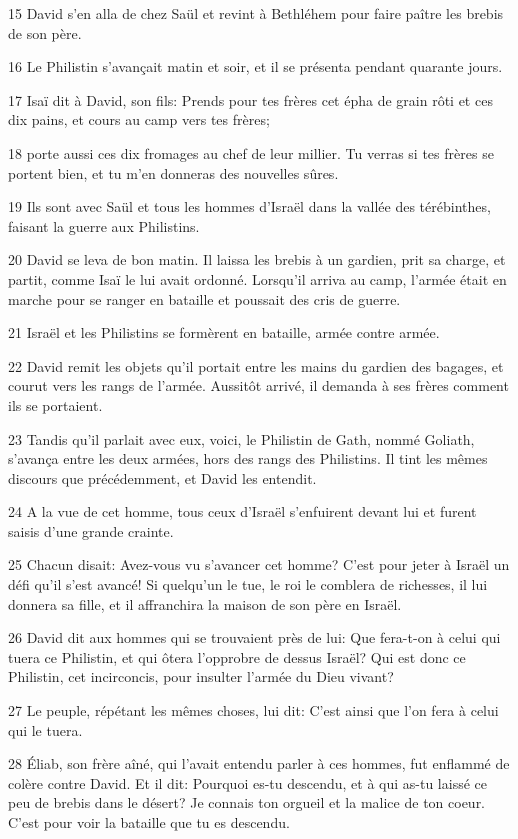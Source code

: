 \par 15 David s'en alla de chez Saül et revint à Bethléhem pour faire paître les brebis de son père.
\par 16 Le Philistin s'avançait matin et soir, et il se présenta pendant quarante jours.
\par 17 Isaï dit à David, son fils: Prends pour tes frères cet épha de grain rôti et ces dix pains, et cours au camp vers tes frères;
\par 18 porte aussi ces dix fromages au chef de leur millier. Tu verras si tes frères se portent bien, et tu m'en donneras des nouvelles sûres.
\par 19 Ils sont avec Saül et tous les hommes d'Israël dans la vallée des térébinthes, faisant la guerre aux Philistins.
\par 20 David se leva de bon matin. Il laissa les brebis à un gardien, prit sa charge, et partit, comme Isaï le lui avait ordonné. Lorsqu'il arriva au camp, l'armée était en marche pour se ranger en bataille et poussait des cris de guerre.
\par 21 Israël et les Philistins se formèrent en bataille, armée contre armée.
\par 22 David remit les objets qu'il portait entre les mains du gardien des bagages, et courut vers les rangs de l'armée. Aussitôt arrivé, il demanda à ses frères comment ils se portaient.
\par 23 Tandis qu'il parlait avec eux, voici, le Philistin de Gath, nommé Goliath, s'avança entre les deux armées, hors des rangs des Philistins. Il tint les mêmes discours que précédemment, et David les entendit.
\par 24 A la vue de cet homme, tous ceux d'Israël s'enfuirent devant lui et furent saisis d'une grande crainte.
\par 25 Chacun disait: Avez-vous vu s'avancer cet homme? C'est pour jeter à Israël un défi qu'il s'est avancé! Si quelqu'un le tue, le roi le comblera de richesses, il lui donnera sa fille, et il affranchira la maison de son père en Israël.
\par 26 David dit aux hommes qui se trouvaient près de lui: Que fera-t-on à celui qui tuera ce Philistin, et qui ôtera l'opprobre de dessus Israël? Qui est donc ce Philistin, cet incirconcis, pour insulter l'armée du Dieu vivant?
\par 27 Le peuple, répétant les mêmes choses, lui dit: C'est ainsi que l'on fera à celui qui le tuera.
\par 28 Éliab, son frère aîné, qui l'avait entendu parler à ces hommes, fut enflammé de colère contre David. Et il dit: Pourquoi es-tu descendu, et à qui as-tu laissé ce peu de brebis dans le désert? Je connais ton orgueil et la malice de ton coeur. C'est pour voir la bataille que tu es descendu.
